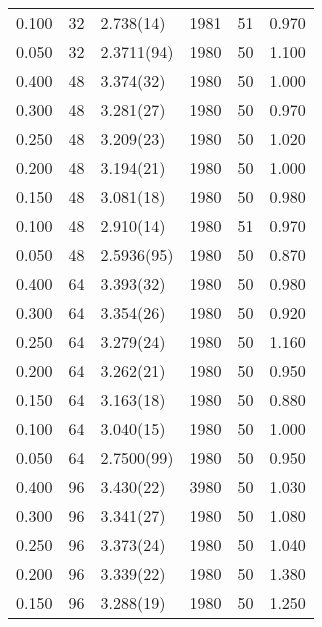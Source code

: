 \begin{tabular}{rrlrrr}
 0.100 &      32 & 2.738(14)  &                1981 &                  51 &    0.970 \\
 0.050 &      32 & 2.3711(94) &                1980 &                  50 &    1.100 \\
 0.400 &      48 & 3.374(32)  &                1980 &                  50 &    1.000 \\
 0.300 &      48 & 3.281(27)  &                1980 &                  50 &    0.970 \\
 0.250 &      48 & 3.209(23)  &                1980 &                  50 &    1.020 \\
 0.200 &      48 & 3.194(21)  &                1980 &                  50 &    1.000 \\
 0.150 &      48 & 3.081(18)  &                1980 &                  50 &    0.980 \\
 0.100 &      48 & 2.910(14)  &                1980 &                  51 &    0.970 \\
 0.050 &      48 & 2.5936(95) &                1980 &                  50 &    0.870 \\
 0.400 &      64 & 3.393(32)  &                1980 &                  50 &    0.980 \\
 0.300 &      64 & 3.354(26)  &                1980 &                  50 &    0.920 \\
 0.250 &      64 & 3.279(24)  &                1980 &                  50 &    1.160 \\
 0.200 &      64 & 3.262(21)  &                1980 &                  50 &    0.950 \\
 0.150 &      64 & 3.163(18)  &                1980 &                  50 &    0.880 \\
 0.100 &      64 & 3.040(15)  &                1980 &                  50 &    1.000 \\
 0.050 &      64 & 2.7500(99) &                1980 &                  50 &    0.950 \\
 0.400 &      96 & 3.430(22)  &                3980 &                  50 &    1.030 \\
 0.300 &      96 & 3.341(27)  &                1980 &                  50 &    1.080 \\
 0.250 &      96 & 3.373(24)  &                1980 &                  50 &    1.040 \\
 0.200 &      96 & 3.339(22)  &                1980 &                  50 &    1.380 \\
 0.150 &      96 & 3.288(19)  &                1980 &                  50 &    1.250 \\

\end{tabular}
